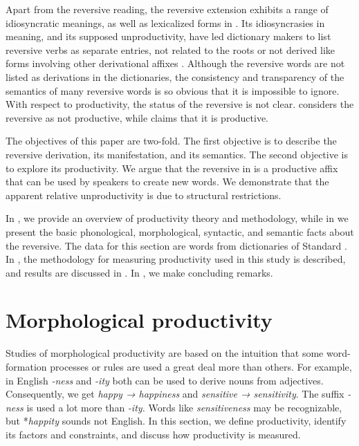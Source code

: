 \documentclass[output=paper]{langsci/langscibook}
\begin{document}
Apart from the reversive reading, the reversive extension exhibits a range of idiosyncratic meanings, as well as lexicalized forms in . Its idiosyncrasies in meaning, and its supposed unproductivity, have led dictionary makers to list reversive verbs as separate entries, not related to the roots or not derived like forms involving other derivational affixes \citep[for example][]{TUKI2001,TUKI2004,Mdeeetal2009}. Although the reversive words are not listed as derivations in the dictionaries, the consistency and transparency of the semantics of many reversive words is so obvious that it is impossible to ignore. With respect to productivity, the status of the reversive is not clear. \citet{Shepardson1986} considers the reversive as not productive, while \citet{Schadeberg1973} claims that it is productive. 

The objectives of this paper are two-fold. The first objective is to describe the reversive derivation, its manifestation, and its semantics. The second objective is to explore its productivity. We argue that the reversive in  is a productive affix that can be used by speakers to create new words. We demonstrate that the apparent relative unproductivity is due to structural restrictions.

In , we provide an overview of productivity theory and methodology, while in  we present the basic phonological, morphological, syntactic, and semantic facts about the reversive. The data for this section are words from dictionaries of Standard . In , the methodology for measuring productivity used in this study is described, and results are discussed in . In , we make concluding remarks.

\section{Morphological productivity} \label{sec:ngonyaningowa:2}

Studies of morphological productivity are based on the intuition that some word-forma\-tion processes or rules are used a great deal more than others. For example, in English \textit{-ness} and \textit{-ity} both can be used to derive nouns from adjectives. Consequently, we get \textit{happy → happiness} and\textit{ sensitive → sensitivity}. The suffix \textit{-ness} is used a lot more than \textit{-ity.} Words like \textit{sensitiveness} may be recognizable, but *\textit{happity} sounds not English. In this section, we define productivity, identify its factors and constraints, and discuss how productivity is measured. 
\end{document}
